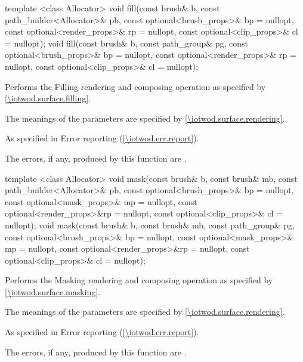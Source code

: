 \begin{itemdecl}
template <class Allocator>
void fill(const brush& b, const path_builder<Allocator>& pb,
  const optional<brush_props>& bp = nullopt,
  const optional<render_props>& rp = nullopt,
  const optional<clip_props>& cl = nullopt);
void fill(const brush& b, const path_group& pg,
  const optional<brush_props>& bp = nullopt,
  const optional<render_props>& rp = nullopt,
  const optional<clip_props>& cl = nullopt);
\end{itemdecl}
\begin{itemdescr}
\pnum
\effects
Performs the Filling rendering and composing operation as specified by \ref{\iotwod.surface.filling}.

\pnum
The meanings of the parameters are specified by \ref{\iotwod.surface.rendering}.

\pnum
\throws
As specified in Error reporting (\ref{\iotwod.err.report}).

\pnum
\errors
The errors, if any, produced by this function are .
\end{itemdescr}

\begin{itemdecl}
template <class Allocator>
void mask(const brush& b, const brush& mb,
  const path_builder<Allocator>& pb,
  const optional<brush_props>& bp = nullopt,
  const optional<mask_props>& mp = nullopt,
  const optional<render_props>&rp = nullopt,
  const optional<clip_props>& cl = nullopt);
void mask(const brush& b, const brush& mb, const path_group& pg,
  const optional<brush_props>& bp = nullopt,
  const optional<mask_props>& mp = nullopt,
  const optional<render_props>&rp = nullopt,
  const optional<clip_props>& cl = nullopt);
\end{itemdecl}
\begin{itemdescr}
\pnum
\effects
Performs the Masking rendering and composing operation as specified by \ref{\iotwod.surface.masking}.

\pnum
The meanings of the parameters are specified by \ref{\iotwod.surface.rendering}.

\pnum
\throws
As specified in Error reporting (\ref{\iotwod.err.report}).

\pnum
\errors

The errors, if any, produced by this function are .
\end{itemdescr}
